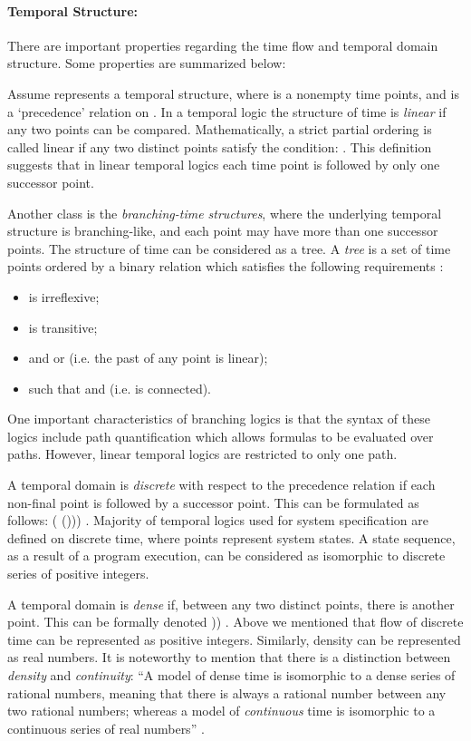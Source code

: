 \documentclass[11pt]{article}
\begin{document}
\paragraph{Temporal Structure:} There are important properties regarding the time flow and temporal domain structure. Some properties are summarized below:

Assume   represents a temporal structure, where  is a nonempty time points, and  is a `precedence' relation on . In a temporal logic the structure of time is \emph{linear} if any two points can be compared. Mathematically, a strict partial ordering is called linear if any two distinct points satisfy the condition: . This definition suggests that in linear temporal logics each time point is followed by only one successor point. 



Another class is the \emph{branching-time structures}, where the underlying temporal structure is  branching-like, and each point may have more than one successor points. The structure of time can be considered as a tree. A \emph{tree} is a set of time points  ordered by a binary relation  which satisfies the following requirements \cite{GHR94}:

\begin{itemize}
\item \noindent  is irreflexive;
\item \noindent  is transitive;
\item \noindent   and 
 or  (i.e. the past of any point is linear);
\item \noindent  such that 
and  (i.e.  is connected).
\end{itemize}

One important characteristics of branching logics is that the syntax of these logics include path quantification which allows formulas to be evaluated over paths. However, linear temporal logics are restricted to only one path.

A temporal domain is \emph{discrete} with respect to the precedence relation  if each non-final point is followed by a successor point. This can be formulated as follows:  ( ())) \cite{Spr02}. Majority of temporal logics used for system specification are defined on discrete time, where points represent system states. A state sequence, as a result of a program execution, can be considered as isomorphic to discrete series of positive integers. 

A temporal domain is \emph{dense} if, between any two distinct points, there is another point. This can be formally denoted  )) \cite{Spr02}. Above we mentioned that flow of discrete time can be represented as positive integers. Similarly, density can be represented as real numbers. It is noteworthy to mention that there is a distinction between \emph{density} and \emph{continuity}: ``A model of dense time is isomorphic to a dense series of rational numbers, meaning that there is always a rational number between any two rational numbers; whereas a model of \emph{continuous} time is isomorphic to a continuous series of real numbers'' \cite{Ven98}.
\end{document}
